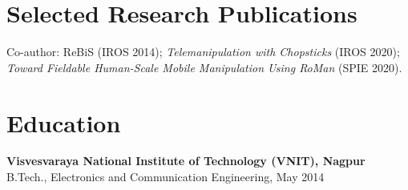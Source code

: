 \documentclass[11pt,a4paper]{article}
\begin{document}
\section*{Selected Research Publications}
Co-author: ReBiS (IROS 2014); \textit{Telemanipulation with Chopsticks}
(IROS 2020); \textit{Toward Fieldable Human-Scale Mobile Manipulation
Using RoMan} (SPIE 2020).

\section*{Education}
\textbf{Visvesvaraya National Institute of Technology (VNIT), Nagpur}\\
B.Tech., Electronics and Communication Engineering, May 2014
\end{document}
